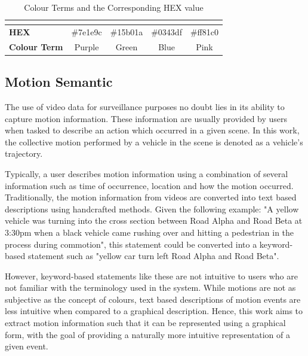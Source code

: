 \begin{table}[!ht]
\begin{tabular}{lcccc}
\multicolumn{1}{l|}{}                     & \multicolumn{1}{l|}{\cellcolor[HTML]{7E1E9C}} & \multicolumn{1}{l|}{\cellcolor[HTML]{15B01A}} & \multicolumn{1}{l|}{\cellcolor[HTML]{0343DF}} & \multicolumn{1}{l|}{\cellcolor[HTML]{FF81C0}} \\ \hline
\multicolumn{1}{|l|}{\textbf{HEX}}        & \multicolumn{1}{c|}{\#7e1e9c}                 & \multicolumn{1}{c|}{\#15b01a}                 & \multicolumn{1}{c|}{\#0343df}                 & \multicolumn{1}{c|}{\#ff81c0}                 \\ \hline
\multicolumn{1}{|l|}{\textbf{Colour Term}}  & \multicolumn{1}{c|}{Purple}                   & \multicolumn{1}{c|}{Green}                    & \multicolumn{1}{c|}{Blue}                     & \multicolumn{1}{c|}{Pink}                     \\ \hline
\end{tabular}
\caption{Colour Terms and the Corresponding HEX value}
\label{table:colorshex}
\end{table}



\subsection{Motion Semantic}

The use of video data for surveillance purposes no doubt lies in its ability to capture motion information. These information are usually provided by users when tasked to describe an action which occurred in a given scene. In this work, the collective motion performed by a vehicle in the scene is denoted as a vehicle's trajectory.  

Typically, a user describes motion information using a combination of several information such as time of occurrence, location and how the motion occurred. Traditionally, the motion information from videos are converted into text based descriptions using handcrafted methods. Given the following example: "A yellow vehicle was turning into the cross section between Road Alpha and Road Beta at 3:30pm when a black vehicle came rushing over and hitting a pedestrian in the process during commotion", this statement could be converted into a keyword-based statement such as "yellow car turn left Road Alpha and Road Beta". 

However, keyword-based statements like these are not intuitive to users who are not familiar with the terminology used in the system. While motions are not as subjective as the concept of colours, text based descriptions of motion events are less intuitive when compared to a graphical description. Hence, this work aims to extract motion information such that it can be represented using a graphical form, with the goal of providing a naturally more intuitive representation of a given event.




